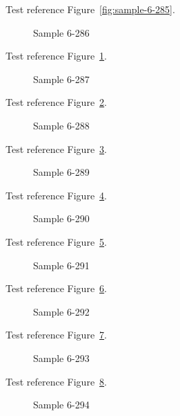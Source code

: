 Test reference Figure~\ref{fig:sample-6-285}.

\begin{figure}[tbhp]
\caption{Sample 6-286}
\label{fig:sample-6-286}
\end{figure}

Test reference Figure~\ref{fig:sample-6-286}.

\begin{figure}[tbhp]
\caption{Sample 6-287}
\label{fig:sample-6-287}
\end{figure}

Test reference Figure~\ref{fig:sample-6-287}.

\begin{figure}[tbhp]
\caption{Sample 6-288}
\label{fig:sample-6-288}
\end{figure}

Test reference Figure~\ref{fig:sample-6-288}.

\begin{figure}[tbhp]
\caption{Sample 6-289}
\label{fig:sample-6-289}
\end{figure}

Test reference Figure~\ref{fig:sample-6-289}.

\begin{figure}[tbhp]
\caption{Sample 6-290}
\label{fig:sample-6-290}
\end{figure}

Test reference Figure~\ref{fig:sample-6-290}.

\begin{figure}[tbhp]
\caption{Sample 6-291}
\label{fig:sample-6-291}
\end{figure}

Test reference Figure~\ref{fig:sample-6-291}.

\begin{figure}[tbhp]
\caption{Sample 6-292}
\label{fig:sample-6-292}
\end{figure}

Test reference Figure~\ref{fig:sample-6-292}.

\begin{figure}[tbhp]
\caption{Sample 6-293}
\label{fig:sample-6-293}
\end{figure}

Test reference Figure~\ref{fig:sample-6-293}.

\begin{figure}[tbhp]
\caption{Sample 6-294}
\label{fig:sample-6-294}
\end{figure}

